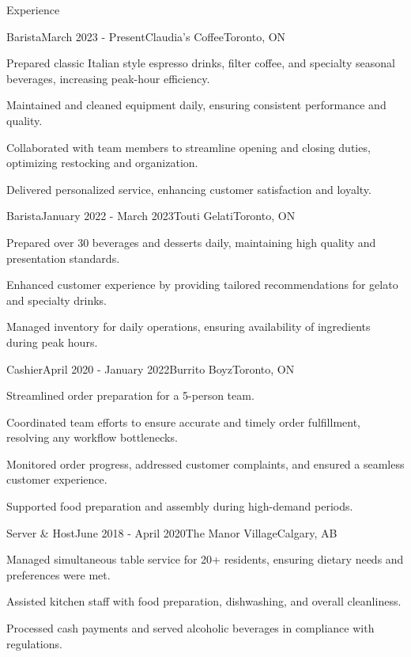 \documentclass[
	11pt, %
]{resume} %
\begin{document}
\begin{rSection}{Experience}

	\begin{rSubsection}{Barista}{March 2023 - Present}{Claudia's Coffee}{Toronto, ON}
		\item Prepared classic Italian style espresso drinks, filter coffee, and specialty seasonal beverages, increasing peak-hour efficiency.
		\item Maintained and cleaned equipment daily, ensuring consistent performance and quality.
		\item Collaborated with team members to streamline opening and closing duties, optimizing restocking and organization.
		\item Delivered personalized service, enhancing customer satisfaction and loyalty.
	\end{rSubsection}


	\begin{rSubsection}{Barista}{January 2022 - March 2023}{Touti Gelati}{Toronto, ON}
		\item Prepared over 30 beverages and desserts daily, maintaining high quality and presentation standards.
		\item Enhanced customer experience by providing tailored recommendations for gelato and specialty drinks.
		\item Managed inventory for daily operations, ensuring availability of ingredients during peak hours.
	\end{rSubsection}


	\begin{rSubsection}{Cashier}{April 2020 - January 2022}{Burrito Boyz}{Toronto, ON}
		\item Streamlined order preparation for a 5-person team.
		\item Coordinated team efforts to ensure accurate and timely order fulfillment, resolving any workflow bottlenecks.
		\item Monitored order progress, addressed customer complaints, and ensured a seamless customer experience.
		\item Supported food preparation and assembly during high-demand periods.
	\end{rSubsection}


	\begin{rSubsection}{Server \& Host}{June 2018 - April 2020}{The Manor Village}{Calgary, AB}
		\item Managed simultaneous table service for 20+ residents, ensuring dietary needs and preferences were met.
		\item Assisted kitchen staff with food preparation, dishwashing, and overall cleanliness.
		\item Processed cash payments and served alcoholic beverages in compliance with regulations.
	\end{rSubsection}

\end{rSection}
\end{document}
